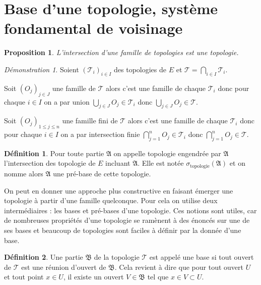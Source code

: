 \documentclass[a4paper, 11pt, french]{book}
\newenvironment{itemise}{\itemize}{\enditemize}
\theoremstyle{plain} %
\newtheorem{proposition}{Proposition}
\theoremstyle{definition} %
\newtheorem{definition}{Définition}
\theoremstyle{remark} %
\newtheorem*{demonstration}{Démonstration}
\newcommand{\1}{\mathds{1}}
\renewcommand{\frak}[1]{\mathfrak{#1}}
\newcommand{\scr}[1]{\mathscr{#1}}
\renewcommand{\rm}[1]{\mathrm{#1}}
\begin{document}
\section{Base d'une topologie, système fondamental de voisinage}

\begin{proposition}
	L'intersection d'une famille de topologies est une topologie.
\end{proposition}

\begin{demonstration}
	Soient $(\scr{T}_i)_{i\in I}$ des topologies de $E$ et $\scr{T}=\bigcap_{i\in I}\scr{T}_i$.
	\begin{itemise}
		\item Soit $(O_j)_{j\in J}$ une famille de $\scr{T}$ alors c'est une famille de chaque $\scr{T}_i$ donc pour chaque $i\in I$ on a par union $\bigcup_{j\in J}O_j\in\scr{T}_i$ donc $\bigcup_{j\in J}O_j\in\scr{T}$.
		\item Soit $(O_j)_{1\leqslant j\leqslant n}$ une famille fini de $\scr{T}$ alors c'est une famille de chaque $\scr{T}_i$ donc pour chaque $i\in I$ on a par intersection finie $\bigcap_{j=1}^nO_j\in\scr{T}_i$ donc $\bigcap_{j=1}^nO_j\in\scr{T}$.
	\end{itemise}
\end{demonstration}

\begin{definition}
	Pour toute partie $\frak{A}$ on appelle topologie engendrée par $\frak{A}$ l'intersection des topologie de $E$ incluant $\frak{A}$.
	Elle est notée $\sigma_\rm{topologie}(\frak{A})$ et on nomme alors $\frak{A}$ une pré-base de cette topologie.
\end{definition}

On peut en donner une approche plus constructive en faisant émerger une topologie à partir d'une famille quelconque.
Pour cela on utilise deux intermédiaires : les bases et pré-bases d'une topologie.
Ces notions sont utiles, car de nombreuses propriétés d'une topologie se ramènent à des énoncés sur une de ses bases et beaucoup de topologies sont faciles à définir par la donnée d'une base. 

\begin{definition}
	Une partie $\frak{B}$ de la topologie $\scr{T}$ est appelé une base si tout ouvert de $\scr{T}$ est une réunion d'ouvert de $\frak{B}$.
	Cela revient à dire que pour tout ouvert $U$ et tout point $x\in U$, il existe un ouvert $V\in\frak{B}$ tel que $x\in V\subset U$.
\end{definition}
\end{document}
